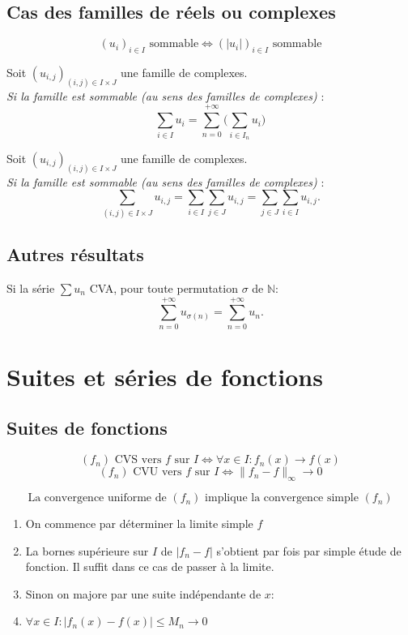 \documentclass[a4paper,12pt]{report}
\newcommand{\Def}[2]{\begin{tcolorbox}[colback=white,colframe=CornflowerBlue, title=Définition : #1]#2\end{tcolorbox}}
\newcommand{\Thm}[2]{\begin{tcolorbox}[colback=white,colframe=Red!60, title=Théorème : #1]#2\end{tcolorbox}}
\newcommand{\Methode}[2]{\begin{tcolorbox}[colback=white, title=Méthode :  #1]#2\end{tcolorbox}}
\newcommand{\ssi}{\Longleftrightarrow}
\begin{document}
\subsection{Cas des familles de réels ou complexes}
\Def{Famille sommable (réels ou complexes)}{
    \[(u_i)_{i\in I} \text{ sommable} \ssi (|u_i|)_{i\in I} \text{ sommable}\]
}

\Thm{Sommation par paquets (cas complexe)}{
Soit $(u_{i,j})_{(i,j) \in I \times J}$ une famille de complexes.\\
\textit{Si la famille est sommable (au sens des familles de complexes)} :
\[\sum_{i\in I}u_i = \sum_{n=0}^{+\infty}\Big(\sum_{i\in I_n}u_i\Big)\]
}

\Thm{Fubini (cas complexe)}{
Soit $(u_{i,j})_{(i,j) \in I \times J}$ une famille de complexes.\\
\textit{Si la famille est sommable (au sens des familles de complexes)} :
\[
\sum_{(i,j) \in I \times J} u_{i,j} = \sum_{i \in I} \sum_{j \in J} u_{i,j} = \sum_{j \in J} \sum_{i \in I} u_{i,j}.
\]
}

\subsection{Autres résultats}
\Thm{Permutation de sommme}{
Si la série $\sum u_n$ CVA, pour toute permutation $\sigma$ de $\mathbb{N}$:
\[
\sum_{n=0}^{+\infty} u_{\sigma(n)} = \sum_{n=0}^{+\infty} u_n.
\]
}

\section{Suites et séries de fonctions}
\subsection{Suites de fonctions}
\Def{2 modes de convergence (Suites de fonctions)}{
\[(f_n) \text{ CVS vers $f$ sur $I$} \ssi \forall x \in I : f_n(x)\longrightarrow f(x)\]
\[(f_n) \text{ CVU vers $f$ sur $I$} \ssi \lVert f_n-f \rVert_\infty \longrightarrow 0\]
}

\Thm{CVU $\implies$ CVS}{
\[\text{La convergence uniforme de $(f_n)$ implique la convergence simple $(f_n)$}\]
}

\Methode{Etablir la convergence uniforme}{
\begin{enumerate}
    \item[] On commence par déterminer la limite simple $f$ 
    \item La bornes supérieure sur $I$ de $|f_n-f|$ s’obtient par
fois par simple étude de fonction. Il suffit dans ce
 cas de passer à la limite.
    \item Sinon on majore par une suite indépendante de $x$:
    \item[] \(\forall x \in I : |f_n(x)-f(x)|\leq M_n \longrightarrow 0\)
\end{enumerate}
}
\end{document}
